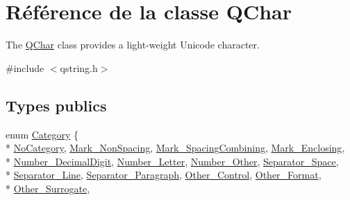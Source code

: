 \hypertarget{class_q_char}{}\section{Référence de la classe Q\+Char}
\label{class_q_char}


The \hyperlink{class_q_char}{Q\+Char} class provides a light-\/weight Unicode character.  




{\ttfamily \#include $<$qstring.\+h$>$}

\subsection*{Types publics}
\begin{DoxyCompactItemize}
\item 
enum \hyperlink{class_q_char_a62908095db0c54f35ff2ae928c621a97}{Category} \{ \\*
\hyperlink{class_q_char_a62908095db0c54f35ff2ae928c621a97a151cde59c69aef6a74ae4a239c35ba69}{No\+Category}, 
\hyperlink{class_q_char_a62908095db0c54f35ff2ae928c621a97acdbd3c36dfc43aec49c8ae3d9fd0c017}{Mark\+\_\+\+Non\+Spacing}, 
\hyperlink{class_q_char_a62908095db0c54f35ff2ae928c621a97a00776d3a95584491d016962dcc030f2f}{Mark\+\_\+\+Spacing\+Combining}, 
\hyperlink{class_q_char_a62908095db0c54f35ff2ae928c621a97ad699d57328e498371bd47bdf9a830cdc}{Mark\+\_\+\+Enclosing}, 
\\*
\hyperlink{class_q_char_a62908095db0c54f35ff2ae928c621a97a65597ecb2811d7ac0a3784c071818b24}{Number\+\_\+\+Decimal\+Digit}, 
\hyperlink{class_q_char_a62908095db0c54f35ff2ae928c621a97a507bbeb6022e9b9d7ff2088109ea3269}{Number\+\_\+\+Letter}, 
\hyperlink{class_q_char_a62908095db0c54f35ff2ae928c621a97aa55e0c40ecd43aab3140ba7795bfc55a}{Number\+\_\+\+Other}, 
\hyperlink{class_q_char_a62908095db0c54f35ff2ae928c621a97a7f81aaad7a441edec2d3aaeb65627126}{Separator\+\_\+\+Space}, 
\\*
\hyperlink{class_q_char_a62908095db0c54f35ff2ae928c621a97acbaf8929f0c3188cc9e6167964250bc7}{Separator\+\_\+\+Line}, 
\hyperlink{class_q_char_a62908095db0c54f35ff2ae928c621a97a05fd6d2d90dd503da9083889a336f581}{Separator\+\_\+\+Paragraph}, 
\hyperlink{class_q_char_a62908095db0c54f35ff2ae928c621a97a259bb147d8b344b82e2f80f45ba5aa65}{Other\+\_\+\+Control}, 
\hyperlink{class_q_char_a62908095db0c54f35ff2ae928c621a97a9649111960049babe5ecd06bdc660cb2}{Other\+\_\+\+Format}, 
\\*
\hyperlink{class_q_char_a62908095db0c54f35ff2ae928c621a97a316351e5f9301a9694fe6d82cc8d5b57}{Other\+\_\+\+Surrogate}, 

\end{DoxyCompactItemize}
